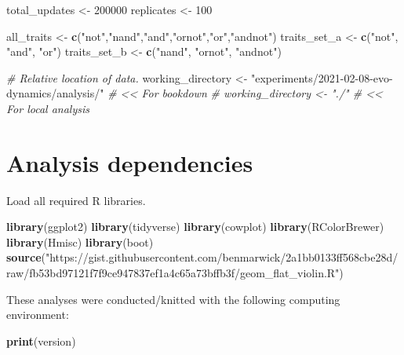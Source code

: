 \documentclass[]{book}
\newenvironment{Shaded}{\begin{snugshade}}{\end{snugshade}}
\newcommand{\CommentTok}[1]{\textcolor[rgb]{0.56,0.35,0.01}{\textit{#1}}}
\newcommand{\DecValTok}[1]{\textcolor[rgb]{0.00,0.00,0.81}{#1}}
\newcommand{\KeywordTok}[1]{\textcolor[rgb]{0.13,0.29,0.53}{\textbf{#1}}}
\newcommand{\NormalTok}[1]{#1}
\newcommand{\StringTok}[1]{\textcolor[rgb]{0.31,0.60,0.02}{#1}}
\begin{document}
\begin{Shaded}
\begin{Highlighting}[]
\NormalTok{total_updates <-}\StringTok{ }\DecValTok{200000}
\NormalTok{replicates <-}\StringTok{ }\DecValTok{100}

\NormalTok{all_traits <-}\StringTok{ }\KeywordTok{c}\NormalTok{(}\StringTok{"not"}\NormalTok{,}\StringTok{"nand"}\NormalTok{,}\StringTok{"and"}\NormalTok{,}\StringTok{"ornot"}\NormalTok{,}\StringTok{"or"}\NormalTok{,}\StringTok{"andnot"}\NormalTok{)}
\NormalTok{traits_set_a <-}\StringTok{ }\KeywordTok{c}\NormalTok{(}\StringTok{"not"}\NormalTok{, }\StringTok{"and"}\NormalTok{, }\StringTok{"or"}\NormalTok{)}
\NormalTok{traits_set_b <-}\StringTok{ }\KeywordTok{c}\NormalTok{(}\StringTok{"nand"}\NormalTok{, }\StringTok{"ornot"}\NormalTok{, }\StringTok{"andnot"}\NormalTok{)}

\CommentTok{# Relative location of data.}
\NormalTok{working_directory <-}\StringTok{ "experiments/2021-02-08-evo-dynamics/analysis/"} \CommentTok{# << For bookdown}
\CommentTok{# working_directory <- "./"                                              # << For local analysis}
\end{Highlighting}
\end{Shaded}

\hypertarget{analysis-dependencies-4}{%
\section{Analysis dependencies}\label{analysis-dependencies-4}}

Load all required R libraries.

\begin{Shaded}
\begin{Highlighting}[]
\KeywordTok{library}\NormalTok{(ggplot2)}
\KeywordTok{library}\NormalTok{(tidyverse)}
\KeywordTok{library}\NormalTok{(cowplot)}
\KeywordTok{library}\NormalTok{(RColorBrewer)}
\KeywordTok{library}\NormalTok{(Hmisc)}
\KeywordTok{library}\NormalTok{(boot)}
\KeywordTok{source}\NormalTok{(}\StringTok{"https://gist.githubusercontent.com/benmarwick/2a1bb0133ff568cbe28d/raw/fb53bd97121f7f9ce947837ef1a4c65a73bffb3f/geom_flat_violin.R"}\NormalTok{)}
\end{Highlighting}
\end{Shaded}

These analyses were conducted/knitted with the following computing environment:

\begin{Shaded}
\begin{Highlighting}[]
\KeywordTok{print}\NormalTok{(version)}
\end{Highlighting}
\end{Shaded}
\end{document}
